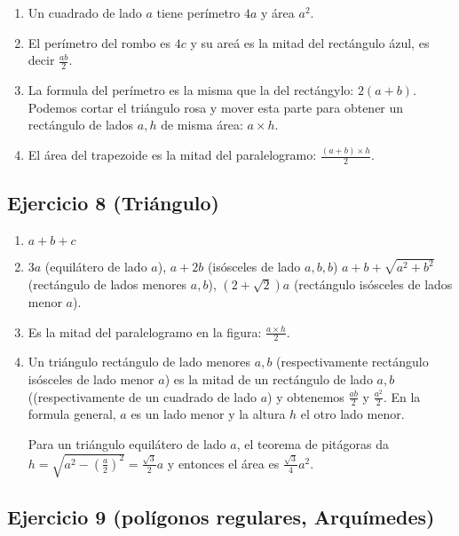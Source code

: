 \begin{enumerate}
\item Un cuadrado de lado $a$ tiene perímetro $4a$ y área $a^2$. 
\item El perímetro del rombo es $4c$ y
  su areá es la mitad del rectángulo ázul, es decir $\frac{ab}{2}$.
\item La formula del perímetro es la misma que la del rectángylo: $2{(a+b)}$.
  Podemos cortar el triángulo rosa y mover esta parte para obtener un
  rectángulo de lados $a,h$ de misma área: $a \times h$.
\item El área del trapezoide es la mitad del paralelogramo:
  $\frac{{(a+b)} \times h}{2}$.
\end{enumerate}

\subsection{Ejercicio 8 (Triángulo)}

\begin{enumerate}
\item $a+b+c$
\item $3a$ (equilátero de lado $a$), $a+2b$ (isósceles de lado $a,b,b$)
  $a+b+\sqrt{a^2+b^2}$ (rectángulo de lados menores $a,b$),
  ${(2+\sqrt{2})}a$ (rectángulo isósceles de lados menor $a$).
\item Es la mitad del paralelogramo en la figura: $\frac{a \times h}{2}$.
\item Un triángulo rectángulo de lado menores $a,b$ (respectivamente
  rectángulo isósceles de lado menor $a$) es la mitad de un rectángulo de lado
  $a,b$ ((respectivamente de un cuadrado de lado $a$) y obtenemos
  $\frac{ab}{2}$ y $\frac{a^2}{2}$. En la formula general, $a$ es un lado menor
  y la altura $h$ el otro lado menor.

  Para un triángulo equilátero de lado $a$, el teorema de pitágoras da
  $h = \sqrt{a^2 - \left(\frac{a}{2}\right)^2} = \frac{\sqrt{3}}{2} a$ y
  entonces el área es $\frac{\sqrt{3}}{4} a^2$.
  
\end{enumerate}

\subsection{Ejercicio 9 (polígonos regulares, Arquímedes)}

